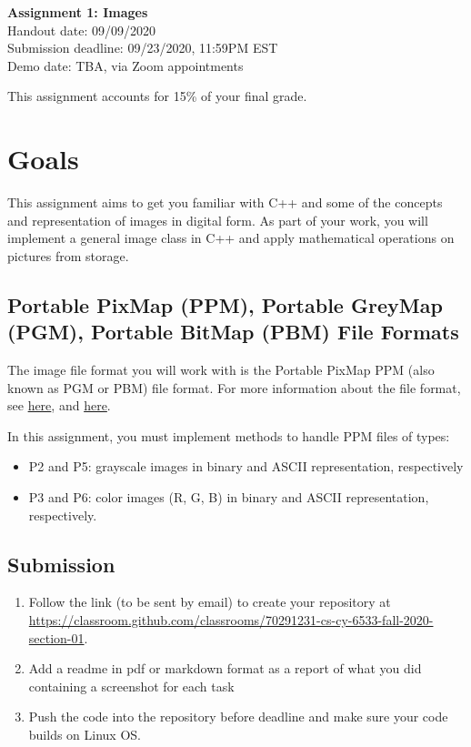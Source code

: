 \documentclass[11pt]{article}
\begin{document}
\hspace{50pt}

\begin{center}

{\Huge \textbf{Assignment 1: Images}}\\
\vspace{10pt}
Handout date: 09/09/2020\\
Submission deadline: 09/23/2020, 11:59PM EST\\
Demo date: TBA, via Zoom appointments
\end{center}

\noindent This assignment accounts for 15\% of your final grade. 

\section*{Goals}
\vspace{-3mm}
This assignment aims to get you familiar with C++ and some of the concepts and representation of images in digital form. As part of your work, you will implement a general image class in C++ and apply mathematical operations on  pictures from storage.

\subsection*{Portable PixMap (PPM), Portable GreyMap (PGM), Portable BitMap (PBM) File Formats}
\vspace{-3mm}
The image file format you will work with is the Portable PixMap PPM (also known as PGM or PBM) file format. For more information about the file format, see \href{http://paulbourke.net/dataformats/ppm/}{here}, and \href{https://people.cs.clemson.edu/~dhouse/courses/405/notes/ppm-files.pdf}{here}.

In this assignment, you must implement methods to handle PPM files of types: 
\begin{itemize}
\item P2 and P5: grayscale images in binary and ASCII representation, respectively
\item P3 and P6: color images (R, G, B) in binary and ASCII representation, respectively. 
\end{itemize}

\subsection*{Submission}
\vspace{-3mm}
\begin{enumerate}
\item Follow the link (to be sent by email) to create your repository at \url{https://classroom.github.com/classrooms/70291231-cs-cy-6533-fall-2020-section-01}.
\item Add a readme in pdf or markdown format as a report of what you did containing a screenshot for each task
\item Push the code into the repository before deadline and make sure your code builds on Linux OS.
\end{enumerate}
\end{document}

